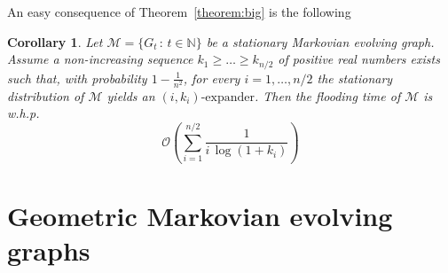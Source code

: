 \documentclass[10pt,a4paper]{article}
\newtheorem{cor}[definition]{Corollary}
\begin{document}
\smallskip\noindent
An easy consequence of Theorem~\ref{theorem:big} is the  following

\begin{cor}\label{cor:big}
Let $\mathcal{M} = \{ G_t \,:\, t \in \mathbb{N} \}$ be a stationary Markovian evolving graph.  Assume
a non-increasing sequence $k_1 \geqslant \dots \geqslant k_{n/2}$ of positive real numbers exists such
that, with probability $1 - \frac{1}{n^2}$, for every $i=1, \dots, n/2$  the stationary distribution of $\mathcal{M}$ yields an
$(i,k_i)\mbox{-expander}$. Then the flooding time of $\mathcal{M}$ is
w.h.p.
$$
\mathcal{O}\left( \sum_{i=1}^{n/2} \frac{1}{i \, \log (1 + k_i)} \right)
$$
\end{cor}




\section{Geometric Markovian evolving graphs} \label{sec::geom}
\end{document}
